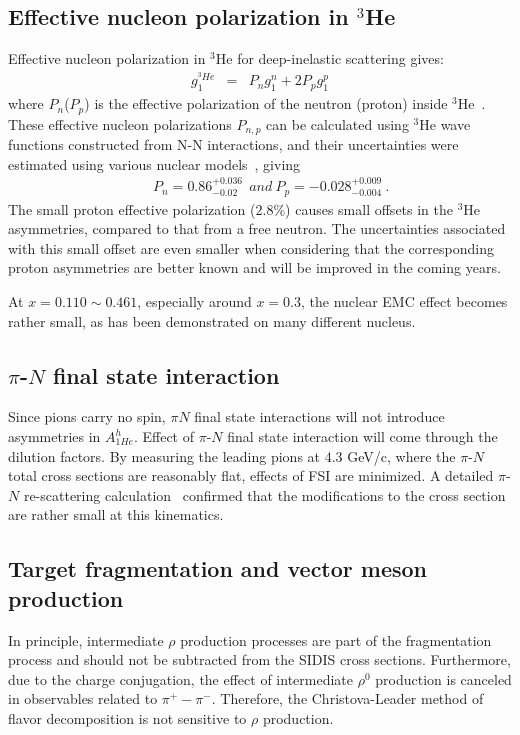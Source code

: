\subsection{Effective nucleon polarization in $^3$He} \label{ch5:he3model}
Effective nucleon polarization in $^3$He for deep-inelastic scattering gives:
\begin{eqnarray}\label{equ:he3-g1n}
 g_1^{^3 {He}} &=& P_ng_1^n+2P_pg_1^p
\end{eqnarray}
where $P_n$($P_p$) is the effective polarization of the neutron 
(proton) inside $^3$He~\cite{theory:PnPp_friar}.
These effective nucleon polarizations $P_{n,p}$ can be
calculated using $^3$He wave functions constructed from N-N interactions,
and their uncertainties were estimated using various nuclear 
models~\cite{theory:PnPp_nogga,theory:PnPp_friar,theory:3Heconv,theory:PnPp_bissey},
giving 
\begin{eqnarray}
&& P_n=0.86^{+0.036}_{-0.02}~~{and}~P_p=-0.028^{+0.009}_{-0.004}~.\label{equ:PnPp}
\end{eqnarray}
%
The small proton effective polarization ($2.8 \%$) causes small 
offsets in the $^3$He asymmetries, compared to that from a 
free neutron.  The uncertainties associated with this small offset are even smaller
when considering that the corresponding proton asymmetries are better known
 and will be improved in the coming years.

At $x=0.110 \sim 0.461$, especially around $x=0.3$, the 
 nuclear EMC effect becomes rather small, as has been demonstrated 
on many different nucleus.

\subsection{$\pi$-$N$ final state interaction }
Since pions carry no spin,  $\pi N$ final state interactions will not introduce 
asymmetries in $A_{1He}^h$. Effect of $\pi$-$N$ final state interaction
will come through the dilution factors. By measuring the leading pions at
$4.3$ GeV/c, where the $\pi$-$N$ total cross sections are reasonably flat, 
effects of FSI are minimized. A detailed $\pi$-$N$ re-scattering calculation~\cite{misak}
confirmed that the modifications to the cross section are rather small at this kinematics.
 

\subsection{Target fragmentation and vector meson production }
 In principle, intermediate $\rho$ production processes are part
 of the fragmentation process and should not be subtracted
 from the SIDIS cross sections. Furthermore, 
 due to the charge conjugation, the effect of intermediate
 $\rho^0$ production is canceled in observables related to
 $\pi^+ - \pi^-$. Therefore, the Christova-Leader method of flavor decomposition
 is not sensitive to $\rho$ production.  

